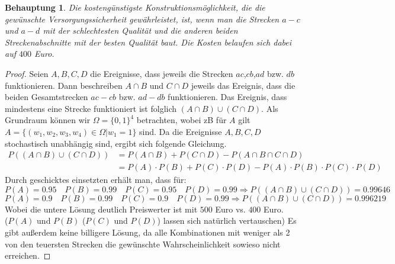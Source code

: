 \documentclass[a4paper]{scrartcl}
\newtheorem*{behaupt}{Behauptung}
\begin{document}
\begin{enumerate}[label=\bfseries\arabic*.]
                \begin{behaupt}
                	Die kostengünstigste Konstruktionsmöglichkeit,
					die die gewünschte Versorgungssicherheit gewährleistet,
					ist, wenn man die Strecken $a-c$ und $a-d$ mit der schlechtesten Qualität und
					die anderen beiden Streckenabschnitte mit der besten Qualität baut. Die Kosten
					belaufen sich dabei auf $400$ Euro.     
                \end{behaupt}
                \begin{proof}
                	Seien $A,B,C,D$ die Ereignisse, dass jeweils die Strecken
					$ac$,$cb$,$ad$ bzw. $db$ funktionieren. Dann beschreiben $A\cap B$ und 
					$C\cap D$ jeweils das Ereignis, dass die beiden Gesamtstrecken $ac-cb$ bzw.
					$ad-db$ funktionieren. Das Ereignis, dass mindestens eine Strecke
					funktioniert ist folglich $(A\cap B)\cup (C\cap D)$.
					Als Grundraum können wir $\Omega=\{0,1\}^4$ betrachten, wobei zB für $A$
					gilt $A=\{(w_1,w_2,w_3,w_4)\in\Omega|w_1=1\}$ sind. Da die Ereignisse
					$A,B,C,D$ stochastisch unabhängig sind, ergibt sich folgende Gleichung.
					\begin{align*}
					P((A\cap B)\cup (C\cap D))
					&=P(A\cap B)+P(C\cap D)-P(A\cap B\cap C\cap D)\\
					&=P(A)\cdot P(B)+P(C)\cdot P(D)-P(A)\cdot P(B)\cdot P(C)\cdot P(D)
					\end{align*}
					Durch geschicktes einsetzten erhält man, dass für:\\
					$P(A)=0.95\quad P(B)=0.99 \quad P(C)=0.95 \quad P(D)=0.99 \Rightarrow
					P((A\cap B)\cup (C\cap D))=0.99646$\\
					$P(A)=0.9\quad P(B)=0.99 \quad P(C)=0.9 \quad P(D)=0.99 \Rightarrow
					P((A\cap B)\cup (C\cap D))=0.996219$\\
					Wobei die untere Lösung deutlich Preiswerter ist mit $500$ Euro vs. $400$ Euro.\\
					($P(A)$ und $P(B)$ ($P(C)$ und $P(D)$) lassen sich natürlich vertauschen)
					Es gibt außerdem keine 
					billigere Lösung, da alle Kombinationen mit weniger als 2 von den 
					teuersten Strecken die gewünschte Wahrscheinlichkeit sowieso nicht erreichen.    
                \end{proof}

                

\end{enumerate}
\end{document}
